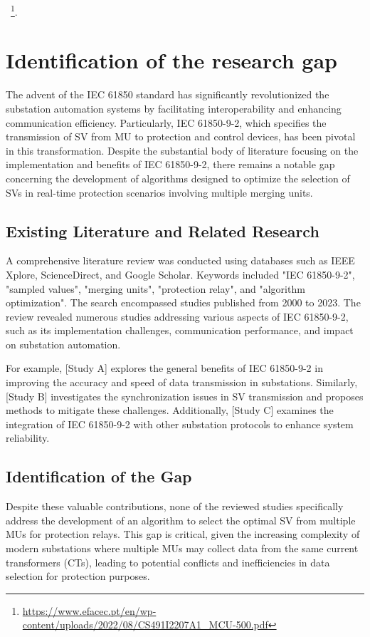 ~\footnote{\url{https://www.efacec.pt/en/wp-content/uploads/2022/08/CS491I2207A1_MCU-500.pdf}}.
\FloatBarrier

\section{Identification of the research gap}

The advent of the IEC 61850 standard has significantly revolutionized the substation automation systems by facilitating interoperability and enhancing communication efficiency. Particularly, IEC 61850-9-2, which specifies the transmission of SV from MU to protection and control devices, has been pivotal in this transformation. Despite the substantial body of literature focusing on the implementation and benefits of IEC 61850-9-2, there remains a notable gap concerning the development of algorithms designed to optimize the selection of SVs in real-time protection scenarios involving multiple merging units.

\subsection{Existing Literature and Related Research}

A comprehensive literature review was conducted using databases such as IEEE Xplore, ScienceDirect, and Google Scholar. Keywords included "IEC 61850-9-2", "sampled values", "merging units", "protection relay", and "algorithm optimization". The search encompassed studies published from 2000 to 2023. The review revealed numerous studies addressing various aspects of IEC 61850-9-2, such as its implementation challenges, communication performance, and impact on substation automation.

For example, [Study A] explores the general benefits of IEC 61850-9-2 in improving the accuracy and speed of data transmission in substations. Similarly, [Study B] investigates the synchronization issues in SV transmission and proposes methods to mitigate these challenges. Additionally, [Study C] examines the integration of IEC 61850-9-2 with other substation protocols to enhance system reliability.

\subsection{Identification of the Gap}

Despite these valuable contributions, none of the reviewed studies specifically address the development of an algorithm to select the optimal SV from multiple MUs for protection relays. This gap is critical, given the increasing complexity of modern substations where multiple MUs may collect data from the same current transformers (CTs), leading to potential conflicts and inefficiencies in data selection for protection purposes.

